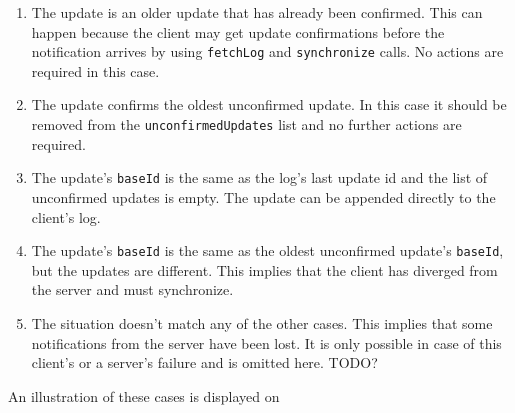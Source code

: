 \documentclass[a4paper, 11pt, oneside]{article}
\theoremstyle{definition}
\begin{document}
\begin{enumerate}
    \item The update is an older update that has already been confirmed. This can happen because the client may get update confirmations before the notification arrives by using \verb|fetchLog| and \verb|synchronize| calls. No actions are required in this case.
    \item The update confirms the oldest unconfirmed update. In this case it should be removed from the \verb|unconfirmedUpdates| list and no further actions are required.
    \item The update's \verb|baseId| is the same as the log's last update id and the list of unconfirmed updates is empty. The update can be appended directly to the client's log.
    \item The update's \verb|baseId| is the same as the oldest unconfirmed update's \verb|baseId|, but the updates are different. This implies that the client has diverged from the server and must synchronize. 
    \item The situation doesn't match any of the other cases. This implies that some notifications from the server have been lost. It is only possible in case of this client's or a server's failure and is omitted here. TODO?
\end{enumerate}

An illustration of these cases is displayed on 
\end{document}

